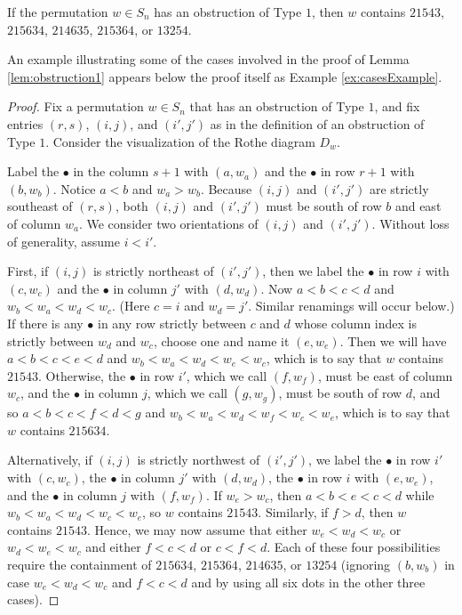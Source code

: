 \begin{lemma}\label{lem:obstruction1} 
If the permutation $w \in S_n$ has an obstruction of Type $1$, then $w$ contains $21543$, $215634$, $214635$, $215364$, or $13254$.
\end{lemma}

An example illustrating some of the cases involved in the proof of Lemma \ref{lem:obstruction1} appears below the proof itself as Example \ref{ex:casesExample}.

\begin{proof}
Fix a permutation $w \in S_n$ that has an obstruction of Type $1$, and fix entries $(r,s)$, $(i,j)$, and $(i',j')$ as in the definition of an obstruction of Type $1$.  Consider the visualization of the Rothe diagram $D_w$.

Label the $\bullet$ in the column $s+1$ with $(a,w_a)$ and the $\bullet$ in row $r+1$ with $(b,w_b)$.  Notice $a<b$ and $w_a>w_b$.   Because $(i,j)$ and $(i',j')$ are strictly southeast of $(r,s)$, both $(i,j)$ and $(i',j')$ must be south of row $b$ and east of column $w_a$.  We consider two orientations of $(i,j)$ and $(i',j')$.  Without loss of generality, assume $i<i'$.

First, if $(i,j)$ is strictly northeast of $(i',j')$, then we label the $\bullet$ in row $i$ with $(c,w_c)$ and the $\bullet$ in column $j'$ with $(d,w_d)$.  Now $a<b<c<d$ and $w_b<w_a<w_d<w_c$.  (Here $c=i$ and $w_d = j'$.  Similar renamings will occur below.)  If there is any $\bullet$ in any row strictly between $c$ and $d$ whose column index is strictly between $w_d$ and $w_c$, choose one and name it $(e,w_e)$.  Then we will have $a<b<c<e<d$ and $w_b<w_a<w_d<w_e<w_c$, which is to say that $w$ contains $21543$.  Otherwise, the $\bullet$ in row $i'$, which we call $(f,w_f)$, must be east of column $w_c$, and the $\bullet$ in column $j$, which we call $(g,w_g)$, must be south of row $d$, and so $a<b<c<f<d<g$ and $w_b<w_a<w_d<w_f<w_c<w_e$, which is to say that $w$ contains $215634$.

Alternatively, if $(i,j)$ is strictly northwest of $(i',j')$, we label the $\bullet$ in row $i'$ with $(c, w_c)$, the $\bullet$ in column $j'$ with $(d,w_d)$, the $\bullet$ in row $i$ with $(e,w_e)$, and the $\bullet$ in column $j$ with $(f,w_f)$.  If $w_e>w_c$, then $a<b<e<c<d$ while $w_b<w_a<w_d<w_c<w_e$, so $w$ contains $21543$.  Similarly, if $f>d$, then $w$ contains $21543$.  Hence, we may now assume that either $w_e<w_d<w_c$ or $w_d<w_e<w_c$ and either $f<c<d$ or $c<f<d$.  Each of these four possibilities require the containment of $215634$, $215364$, $214635$, or $13254$ (ignoring $(b,w_b)$ in case $w_e<w_d<w_c$ and $f<c<d$ and by using all six dots in the other three cases).
\end{proof}

